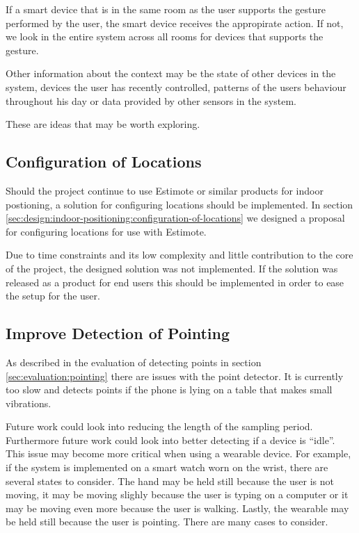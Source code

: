 If a smart device that is in the same room as the user supports the gesture performed by the user, the smart device receives the appropirate action. If not, we look in the entire system across all rooms for devices that supports the gesture.

Other information about the context may be the state of other devices in the system, devices the user has recently controlled, patterns of the users behaviour throughout his day or data provided by other sensors in the system.

These are ideas that may be worth exploring. 

\subsection{Configuration of Locations}

Should the project continue to use Estimote or similar products for indoor postioning, a solution for configuring locations should be implemented. In section \ref{sec:design:indoor-positioning:configuration-of-locations} we designed a proposal for configuring locations for use with Estimote. 

Due to time constraints and its low complexity and little contribution to the core of the project, the designed solution was not implemented. If the solution was released as a product for end users this should be implemented in order to ease the setup for the user.

\subsection{Improve Detection of Pointing}

As described in the evaluation of detecting points in section \ref{sec:evaluation:pointing} there are issues with the point detector. It is currently too slow and detects points if the phone is lying on a table that makes small vibrations.

Future work could look into reducing the length of the sampling period. Furthermore future work could look into better detecting if a device is ``idle''. This issue may become more critical when using a wearable device. For example, if the system is implemented on a smart watch worn on the wrist, there are several states to consider. The hand may be held still because the user is not moving, it may be moving slighly because the user is typing on a computer or it may be moving even more because the user is walking. Lastly, the wearable may be held still because the user is pointing. There are many cases to consider.

